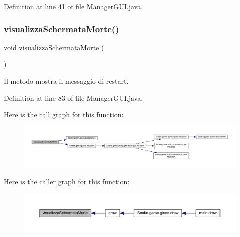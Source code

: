 Definition at line 41 of file Manager\+G\+U\+I.\+java.

\mbox{\label{class_snake_1_1gui_1_1_manager_g_u_i_a8e244c775b546a6e7d89884af1495892}} 
\subsubsection{\texorpdfstring{visualizza\+Schermata\+Morte()}{visualizzaSchermataMorte()}}
{\footnotesize\ttfamily void visualizza\+Schermata\+Morte (\begin{DoxyParamCaption}{ }\end{DoxyParamCaption})\hspace{0.3cm}{\ttfamily [private]}}



Il metodo mostra il messaggio di restart. 



Definition at line 83 of file Manager\+G\+U\+I.\+java.

Here is the call graph for this function\+:
\nopagebreak
\begin{figure}[H]
\begin{center}
\leavevmode
\includegraphics[width=350pt]{class_snake_1_1gui_1_1_manager_g_u_i_a8e244c775b546a6e7d89884af1495892_cgraph}
\end{center}
\end{figure}
Here is the caller graph for this function\+:
\nopagebreak
\begin{figure}[H]
\begin{center}
\leavevmode
\includegraphics[width=350pt]{class_snake_1_1gui_1_1_manager_g_u_i_a8e244c775b546a6e7d89884af1495892_icgraph}
\end{center}
\end{figure}


